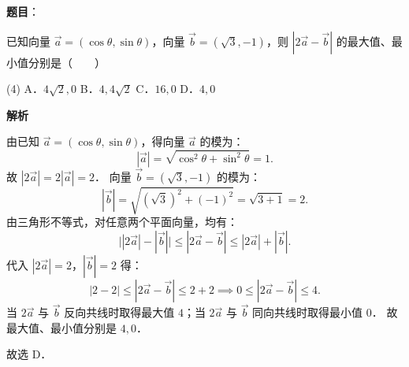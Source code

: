 \begin{answer}

\textbf{题目}：

已知向量 $\vec{a} = (\cos\theta, \sin\theta)$，向量 $\vec{b} = (\sqrt{3}, -1)$，则 $|2\vec{a} - \vec{b}|$ 的最大值、最小值分别是\mbox{（　　）}

\begin{gkopts}(4)
\task A．$4\sqrt{2}, 0$
\task B．$4, 4\sqrt{2}$
\task C．$16, 0$
\task D．$4, 0$
\end{gkopts}

\textbf{解析}

由已知 $\vec{a} = (\cos\theta, \sin\theta)$，得向量 $\vec{a}$ 的模为：
\nopagebreak[4]
\[
|\vec{a}| = \sqrt{\cos^2\theta + \sin^2\theta} = 1.
\]
故 $|2\vec{a}| = 2|\vec{a}| = 2$．
向量 $\vec{b} = (\sqrt{3}, -1)$ 的模为：
\nopagebreak[4]
\[
|\vec{b}| = \sqrt{(\sqrt{3})^2 + (-1)^2} = \sqrt{3 + 1} = 2.
\]
由三角形不等式，对任意两个平面向量，均有：
\nopagebreak[4]
\[
\big| |2\vec{a}| - |\vec{b}| \big| \leqslant |2\vec{a} - \vec{b}| \leqslant |2\vec{a}| + |\vec{b}|.
\]
代入 $|2\vec{a}| = 2$，$|\vec{b}| = 2$ 得：
\nopagebreak[4]
\[
|2 - 2| \leqslant |2\vec{a} - \vec{b}| \leqslant 2 + 2 \implies 0 \leqslant |2\vec{a} - \vec{b}| \leqslant 4.
\]
当 $2\vec{a}$ 与 $\vec{b}$ 反向共线时取得最大值 $4$；当 $2\vec{a}$ 与 $\vec{b}$ 同向共线时取得最小值 $0$．
故最大值、最小值分别是 $4, 0$．

故选 D．


\end{answer}
